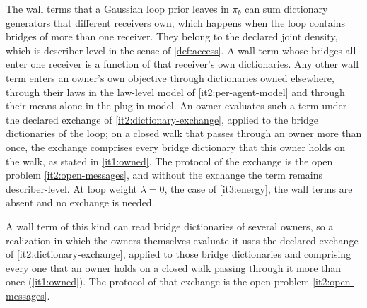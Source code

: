 

The wall terms that a Gaussian loop prior leaves in $\pi_b$ can sum dictionary generators that different receivers own, which happens when the loop contains bridges of more than one receiver. They belong to the declared joint density, which is describer-level in the sense of \cref{def:access}. A wall term whose bridges all enter one receiver is a function of that receiver's own dictionaries. Any other wall term enters an owner's own objective through dictionaries owned elsewhere, through their laws in the law-level model of \cref{it2:per-agent-model} and through their means alone in the plug-in model. An owner evaluates such a term under the declared exchange of \cref{it2:dictionary-exchange}, applied to the bridge dictionaries of the loop; on a closed walk that passes through an owner more than once, the exchange comprises every bridge dictionary that this owner holds on the walk, as stated in \cref{it1:owned}. The protocol of the exchange is the open problem \cref{it2:open-messages}, and without the exchange the term remains describer-level. At loop weight $\lambda=0$, the case of \cref{it3:energy}, the wall terms are absent and no exchange is needed.


A wall term of this kind can read bridge dictionaries of several owners, so a realization in which the owners themselves evaluate it uses the declared exchange of \cref{it2:dictionary-exchange}, applied to those bridge dictionaries and comprising every one that an owner holds on a closed walk passing through it more than once (\cref{it1:owned}). The protocol of that exchange is the open problem \cref{it2:open-messages}.
